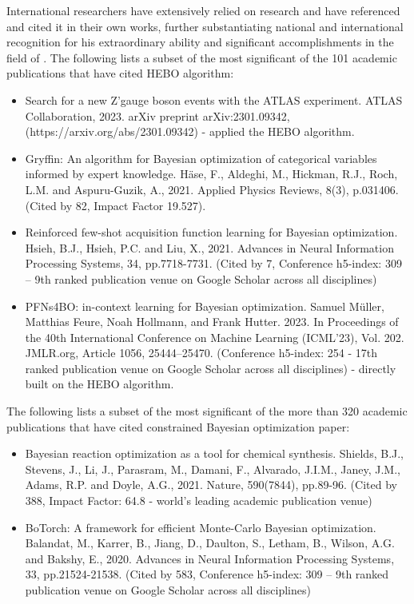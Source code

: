 \documentclass[11pt]{article}
\begin{document}
International researchers have extensively relied on \drs research and have referenced and cited it in their own works, further substantiating \drs national and international recognition for his extraordinary ability and significant accomplishments in the field of \fie{}. The following lists a subset of the most significant of the 101 academic publications that have cited \drs HEBO algorithm:

\begin{itemize}
    \item Search for a new Z'gauge boson events with the ATLAS experiment. ATLAS Collaboration, 2023. arXiv preprint arXiv:2301.09342,(https://arxiv.org/abs/2301.09342) - applied the HEBO algorithm.
    \item Gryffin: An algorithm for Bayesian optimization of categorical variables informed by expert knowledge. Häse, F., Aldeghi, M., Hickman, R.J., Roch, L.M. and Aspuru-Guzik, A., 2021. Applied Physics Reviews, 8(3), p.031406. (Cited by 82, Impact Factor 19.527).
    \item Reinforced few-shot acquisition function learning for Bayesian optimization. Hsieh, B.J., Hsieh, P.C. and Liu, X., 2021. Advances in Neural Information Processing Systems, 34, pp.7718-7731. (Cited by 7, Conference h5-index: 309 – 9th ranked publication venue on Google Scholar across
all disciplines)
    \item PFNs4BO: in-context learning for Bayesian optimization. Samuel Müller, Matthias Feure, Noah Hollmann, and Frank Hutter. 2023.  In Proceedings of the 40th International Conference on Machine Learning (ICML'23), Vol. 202. JMLR.org, Article 1056, 25444–25470. (Conference h5-index: 254 - 17th ranked publication venue on Google Scholar across all disciplines) - directly built on the HEBO algorithm.
\end{itemize}

The following lists a subset of the most significant of the more than 320 academic publications that have cited \drs constrained Bayesian optimization paper:

\begin{itemize}
    \item Bayesian reaction optimization as a tool for chemical synthesis. Shields, B.J., Stevens, J., Li, J., Parasram, M., Damani, F., Alvarado, J.I.M., Janey, J.M., Adams, R.P. and Doyle, A.G., 2021. Nature, 590(7844), pp.89-96. (Cited by 388, Impact Factor: 64.8 - world’s leading academic publication venue)
    \item BoTorch: A framework for efficient Monte-Carlo Bayesian optimization. Balandat, M., Karrer, B., Jiang, D., Daulton, S., Letham, B., Wilson, A.G. and Bakshy, E., 2020. Advances in Neural Information Processing Systems, 33, pp.21524-21538. (Cited by 583, Conference h5-index: 309 – 9th ranked publication venue on Google Scholar across all disciplines)
\end{itemize}
\end{document}
